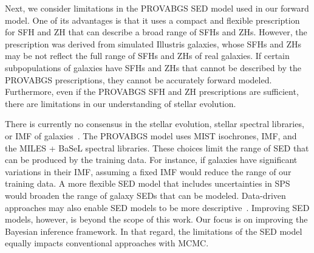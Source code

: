Next, we consider limitations in the PROVABGS SED model used in our forward
model. 
One of its advantages is that it uses a compact and flexible prescription for
SFH and ZH that can describe a broad range of SFHs and ZHs.
However, the prescription was derived from simulated Illustris galaxies, whose
SFHs and ZHs may be not reflect the full range of SFHs and ZHs of real galaxies.
If certain subpopulations of galaxies have SFHs and ZHs that cannot be
described by the PROVABGS prescriptions, they cannot be accurately forward
modeled. 
Furthermore, even if the PROVABGS SFH and ZH prescriptions are sufficient,
there are limitations in our understanding of stellar evolution. 

There is currently no consensus in the stellar evolution, stellar spectral
libraries, or IMF of galaxies~\citep[\emph{e.g.}][]{treu2010, vandokkum2010,
rosani2018, ge2019, sonnenfeld2019}.
The PROVABGS model uses MIST isochrones, \cite{chabrier2003} IMF, and the MILES
+ BaSeL spectral libraries. 
These choices limit the range of SED that can be produced by the training data. 
For instance, if galaxies have significant variations in their IMF, assuming a
fixed IMF would reduce the range of our training data.  
A more flexible SED model that includes uncertainties in SPS would broaden the
range of galaxy SEDs that can be modeled.
Data-driven approaches may also enable SED models to be more
descriptive~\citep[\emph{e.g.}][]{hogg2016, portillo2020}. 
Improving  SED models, however, is beyond the scope of this work. 
Our focus is on improving the Bayesian inference framework.
In that regard, the limitations of the SED model equally impacts conventional
approaches with MCMC. 


